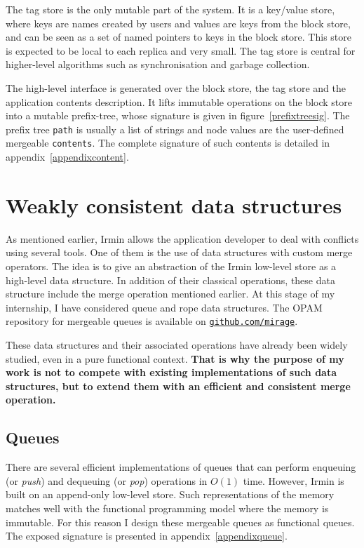 \documentclass{article}
\newcommand{\irmin}{Irmin\xspace}
\newcommand{\opam}{OPAM\xspace}
\newcommand{\code}[1]{\texttt{#1}}
\begin{document}
The tag store is the only mutable part of the system.
It is a key/value store, where keys are names created by users and values are keys from the block store, and can be seen as a set of named pointers to keys in the block store.
This store is expected to be local to each replica and very small.
The tag store is central for higher-level algorithms such as synchronisation and garbage collection.

The high-level interface is generated over the block store, the tag store and the application contents description.
It lifts immutable operations on the block store into a mutable prefix-tree, whose signature is given in figure~\ref{prefixtreesig}.
The prefix tree \code{path} is usually a list of strings and node values are the user-defined mergeable \code{contents}.
The complete signature of such contents is detailed in appendix~\ref{appendixcontent}.



\section{Weakly consistent data structures}

As mentioned earlier, \irmin allows the application developer to deal with conflicts using several tools.
One of them is the use of data structures with custom merge operators.
The idea is to give an abstraction of the \irmin low-level store as a high-level data structure.
In addition of their classical operations, these data structure include the merge operation mentioned earlier. 
At this stage of my internship, I have considered queue and rope data structures.
The \opam repository for mergeable queues is available on \href{https://github.com/mirage/merge-queues}{\texttt{github.com/mirage}}.

These data structures and their associated operations have already been widely studied, even in a pure functional context\cite{PurelyFunctionalDataStructures1996}.
\textbf{That is why the purpose of my work is not to compete with existing implementations of such data structures, but to extend them with an efficient and consistent merge operation.}


\subsection{Queues}

There are several efficient implementations of queues that can perform enqueuing (or \emph{push}) and dequeuing (or \emph{pop}) operations in $O(1)$ time.
However, \irmin is built on an append-only low-level store.
Such representations of the memory matches well with the functional programming model where the memory is immutable.
For this reason I design these mergeable queues as functional queues.
The exposed signature is presented in appendix~\ref{appendixqueue}.
\end{document}
